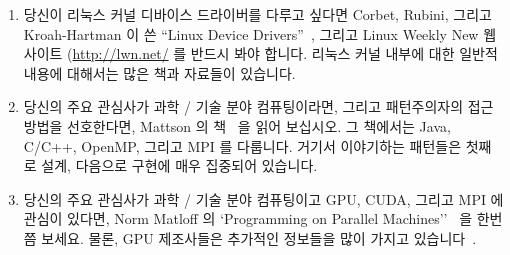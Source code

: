 \begin{enumerate}
\iffalse
\item	If you are interested in an object-oriented patternist
	treatment of parallel programming focussing on C++,
	you might try Volumes~2 and 4 of Schmidt's POSA
	series~\cite{SchmidtStalRohnertBuschmann2000v2Textbook,
	BuschmannHenneySchmidt2007v4Textbook}.
	Volume 4 in particular has some interesting chapters
	applying this work to a warehouse application.
	The realism of this example is attested to by
	the section entitled ``Partitioning the Big Ball of Mud'',
	wherein the problems inherent in parallelism often
	take a back seat to the problems inherent in getting
	one's head around a real-world application.
\fi

\item	당신이 리눅스 커널 디바이스 드라이버를 다루고 싶다면 Corbet, Rubini,
	그리고 Kroah-Hartman 이 쓴 ``Linux Device
	Drivers''~\cite{CorbetRubiniKroahHartman}, 그리고 Linux Weekly New
	웹사이트 (\url{http://lwn.net/} 를 반드시 봐야 합니다.
	리눅스 커널 내부에 대한 일반적 내용에 대해서는 많은 책과 자료들이
	있습니다.

\iffalse
\item	If you want to work with Linux-kernel device drivers,
	then Corbet's, Rubini's, and Kroah-Hartman's
	``Linux Device Drivers''~\cite{CorbetRubiniKroahHartman}
	is indispensable, as is the Linux Weekly News web site
	(\url{http://lwn.net/}).
	There is a large number of books and resources on
	the more general topic of Linux kernel internals.
\fi

\item	당신의 주요 관심사가 과학 / 기술 분야 컴퓨팅이라면, 그리고 패턴주의자의
	접근방법을 선호한다면, Mattson 의 책~\cite{Mattson2005Textbook} 을 읽어
	보십시오.
	그 책에서는 Java, C/C++, OpenMP, 그리고 MPI 를 다룹니다.
	거기서 이야기하는 패턴들은 첫째로 설계, 다음으로 구현에 매우 집중되어
	있습니다.

\iffalse
\item	If your primary focus is scientific and technical computing,
	and you prefer a patternist approach,
	you might try Mattson et al.'s
	textbook~\cite{Mattson2005Textbook}.
	It covers Java, C/C++, OpenMP, and MPI.
	Its patterns are admirably focused first on design,
	then on implementation.
\fi

\item	당신의 주요 관심사가 과학 / 기술 분야 컴퓨팅이고 GPU, CUDA, 그리고 MPI
	에 관심이 있다면, Norm Matloff 의 `Programming on Parallel
	Machines''~\cite{NormMatloff2013ParProcBook} 을 한번쯤 보세요.
	물론, GPU 제조사들은 추가적인 정보들을 많이 가지고 있습니다~\cite{AMD2017OpenCL,NVidia2017GPGPU,NVidia2017GPGPU-university}.


\end{enumerate}
